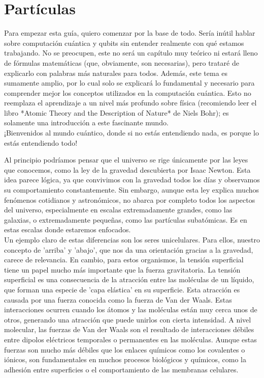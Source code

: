 \section{Partículas}
\noindent 
Para empezar esta guía, quiero comenzar por la base de todo. Sería inútil hablar sobre computación cuántica y qubits sin entender realmente con qué estamos trabajando. No se preocupen, este no será un capítulo muy teórico ni estará lleno de fórmulas matemáticas (que, obviamente, son necesarias), pero trataré de explicarlo con palabras más naturales para todos. Además, este tema es sumamente amplio, por lo cual solo se explicará lo fundamental y necesario para comprender mejor los conceptos utilizados en la computación cuántica. Esto no reemplaza el aprendizaje a un nivel más profundo sobre física (recomiendo leer el libro *Atomic Theory and the Description of Nature* de Niels Bohr); es solamente una introducción a este fascinante mundo.\\

\noindent 
¡Bienvenidos al mundo cuántico, donde si no estás entendiendo nada, es porque lo estás entendiendo todo!

\noindent 
Al principio podríamos pensar que el universo se rige únicamente por las leyes que conocemos, como la ley de la gravedad descubierta por Isaac Newton. Esta idea parece lógica, ya que convivimos con la gravedad todos los días y observamos su comportamiento constantemente. Sin embargo, aunque esta ley explica muchos fenómenos cotidianos y astronómicos, no abarca por completo todos los aspectos del universo, especialmente en escalas extremadamente grandes, como las galaxias, o extremadamente pequeñas, como las partículas subatómicas. Es en estas escalas donde estaremos enfocados.\\

\noindent 
Un ejemplo claro de estas diferencias son los seres unicelulares. Para ellos, nuestro concepto de 'arriba' y 'abajo', que nos da una orientación gracias a la gravedad, carece de relevancia. En cambio, para estos organismos, la tensión superficial tiene un papel mucho más importante que la fuerza gravitatoria. La tensión superficial es una consecuencia de la atracción entre las moléculas de un líquido, que forman una especie de 'capa elástica' en su superficie. Esta atracción es causada por una fuerza conocida como la fuerza de Van der Waals. Estas interacciones ocurren cuando los átomos y las moléculas están muy cerca unos de otros, generando una atracción que puede unirlos con cierta intensidad. A nivel molecular, las fuerzas de Van der Waals son el resultado de interacciones débiles entre dipolos eléctricos temporales o permanentes en las moléculas. Aunque estas fuerzas son mucho más débiles que los enlaces químicos como los covalentes o iónicos, son fundamentales en muchos procesos biológicos y químicos, como la adhesión entre superficies o el comportamiento de las membranas celulares.\\

